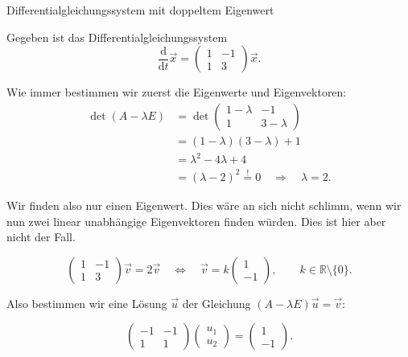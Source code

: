 \begin{bsp}{Differentialgleichungssystem mit doppeltem Eigenwert}{}

    Gegeben ist das Differentialgleichungssystem
    \[
        \frac{\mathrm{d}}{\mathrm{d}t}\vec{x}
        =
        \begin{pmatrix}
            1 & -1 \\
            1 & 3
        \end{pmatrix}
        \vec{x}.
    \]

    Wie immer bestimmen wir zuerst die Eigenwerte und Eigenvektoren:
    \[
        \begin{aligned}
            \det(A-\lambda E)
             & =
            \det\begin{pmatrix}
                    1-\lambda & -1        \\
                    1         & 3-\lambda
                \end{pmatrix} \\
             & =(1-\lambda)(3-\lambda)+1  \\
             & =\lambda^2-4\lambda+4      \\
             & =(\lambda-2)^2
            \stackrel{!}{=}0
            \quad\Rightarrow\quad \lambda=2.
        \end{aligned}
    \]

    Wir finden also nur einen Eigenwert. Dies wäre an sich nicht schlimm,
    wenn wir nun zwei linear unabhängige Eigenvektoren finden würden.
    Dies ist hier aber nicht der Fall.

    \[
        \begin{pmatrix}
            1 & -1 \\
            1 & 3
        \end{pmatrix}
        \vec{v}
        =2\vec{v}
        \quad\Longleftrightarrow\quad
        \vec{v}
        =k\begin{pmatrix}1\\-1\end{pmatrix},
        \qquad k\in\mathbb{R}\setminus\{0\}.
    \]

    Also bestimmen wir eine Lösung \(\vec{u}\) der Gleichung
    \((A-\lambda E)\vec{u}=\vec{v}\):

    \[
        \begin{pmatrix}
            -1 & -1 \\
            1  & 1
        \end{pmatrix}
        \begin{pmatrix}
            u_1 \\u_2
        \end{pmatrix}
        =
        \begin{pmatrix}
            1 \\-1
        \end{pmatrix}.
    \]


\end{bsp}
